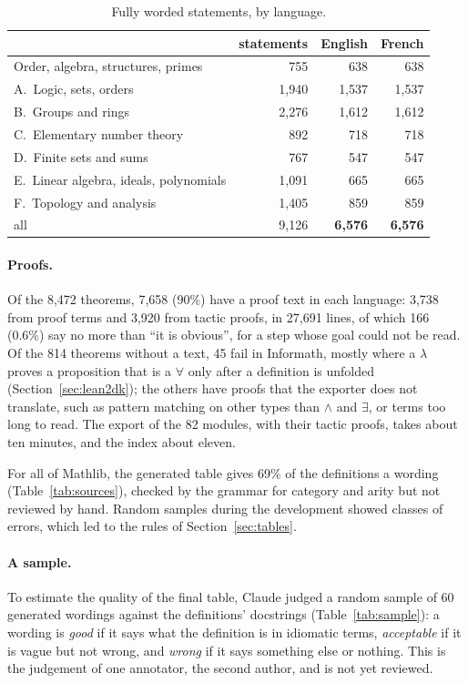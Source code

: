 \documentclass{easychair}
\begin{document}
\begin{table}[t]
\centering\small
\begin{tabular}{lrrr}
\toprule
& statements & English & French \\
\midrule
Order, algebra, structures, primes & 755 & 638 & 638 \\
A.\ Logic, sets, orders & 1,940 & 1,537 & 1,537 \\
B.\ Groups and rings & 2,276 & 1,612 & 1,612 \\
C.\ Elementary number theory & 892 & 718 & 718 \\
D.\ Finite sets and sums & 767 & 547 & 547 \\
E.\ Linear algebra, ideals, polynomials & 1,091 & 665 & 665 \\
F.\ Topology and analysis & 1,405 & 859 & 859 \\
\midrule
all & 9,126 & \textbf{6,576} & \textbf{6,576} \\
\bottomrule
\end{tabular}
\caption{Fully worded statements, by language.}
\label{tab:results}
\end{table}

\paragraph{Proofs.} Of the 8,472 theorems, 7,658 (90\%) have a proof text in each language:
3,738 from proof terms and 3,920 from tactic proofs, in 27,691 lines, of which 166
(0.6\%) say no more than ``it is obvious'', for a step whose goal could not be read. Of the
814 theorems without a text, 45 fail in Informath, mostly where a $\lambda$ proves a proposition
that is a $\forall$ only after a definition is unfolded (Section~\ref{sec:lean2dk}); the others
have proofs that the exporter does not translate, such as pattern matching on other types than
$\wedge$ and $\exists$, or terms too long to read. The export of the 82 modules, with their tactic
proofs, takes about ten minutes, and the index about eleven.

For all of Mathlib, the generated table gives 69\% of the definitions a wording
(Table~\ref{tab:sources}), checked by the grammar for category and arity but not reviewed by
hand. Random samples during the development showed classes of errors, which led to the rules
of Section~\ref{sec:tables}.

\paragraph{A sample.} To estimate the quality of the final table, Claude judged a random sample
of 60 generated wordings against the definitions' docstrings (Table~\ref{tab:sample}): a wording
is \emph{good} if it says what the definition is in idiomatic terms, \emph{acceptable} if it is
vague but not wrong, and \emph{wrong} if it says something else or nothing. This is the judgement
of one annotator, the second author, and is not yet reviewed.
\end{document}
